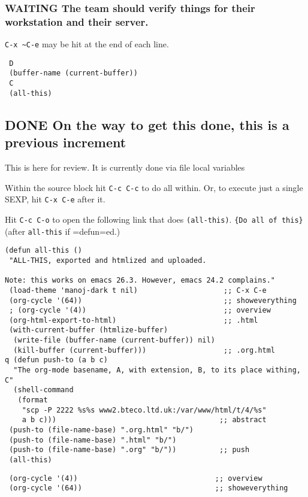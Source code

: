 \documentclass[11pt]{article}
\begin{document}
\subsubsection*{\textbf{WAITING} The team should verify things for \textbf{their} workstation and \textbf{their} server.}
\label{sec-5-1-3}


 \verb,C-x ~C-e, may be hit at the end of each line.

\begin{verbatim}
 D
 (buffer-name (current-buffer))
 C
 (all-this)
\end{verbatim}
\subsection*{\textbf{DONE} On the way to get this done, this is a previous increment}
\label{sec-5-2}


  This is here for review. It is currently done via file local variables

  Within the source block hit \texttt{C-c C-c} to do all within.
  Or, to execute just a single SEXP, hit \texttt{C-x C-e} after it.

  Hit \texttt{C-c C-o} to open the following link that does \texttt{(all-this)}.
  \texttt{\{Do all of this\}} (after \texttt{all-this} if =defun=ed.)


\begin{verbatim}
(defun all-this ()
 "ALL-THIS, exported and htmlized and uploaded.

Note: this works on emacs 26.3. However, emacs 24.2 complains."
 (load-theme 'manoj-dark t nil)                    ;; C-x C-e
 (org-cycle '(64))                                 ;; showeverything
 ; (org-cycle '(4))                                ;; overview
 (org-html-export-to-html)                         ;; .html
 (with-current-buffer (htmlize-buffer) 
  (write-file (buffer-name (current-buffer)) nil)
  (kill-buffer (current-buffer)))                  ;; .org.html
q (defun push-to (a b c)
  "The org-mode basename, A, with extension, B, to its place withing, C"
  (shell-command
   (format
    "scp -P 2222 %s%s www2.bteco.ltd.uk:/var/www/html/t/4/%s"
    a b c)))                                      ;; abstract
 (push-to (file-name-base) ".org.html" "b/")
 (push-to (file-name-base) ".html" "b/")
 (push-to (file-name-base) ".org" "b/"))          ;; push
 (all-this)
\end{verbatim}

\begin{verbatim}
 (org-cycle '(4))                                ;; overview
 (org-cycle '(64))                               ;; showeverything
\end{verbatim}
\end{document}
